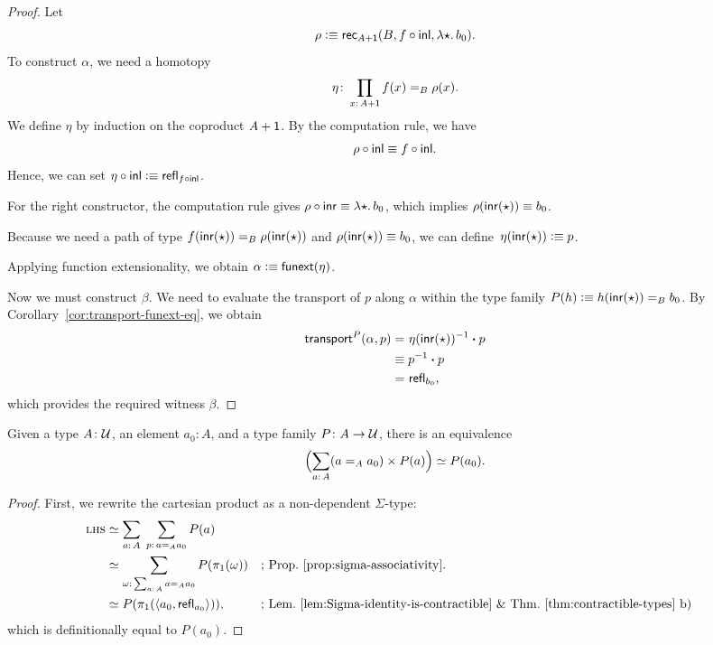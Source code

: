 \begin{proof}
    Let
    \[
        \rho\mathrel{\vcentcolon}\equiv\mathsf{rec}_{A+\mathsf{1}}(
            B,
            f\circ\mathsf{inl},
            \lambda{\mathsf{\star}}.\,b_0
        ).
    \]
    To construct $\alpha$, we need a homotopy
    \[
        \eta\colon\prod_{x\colon A+\fun1}
            f(x)\eq{B}\rho(x).
    \]
    We define $\eta$ by induction on the coproduct $A+\mathsf{1}$. By the computation rule, we have
    \[
        \rho\circ\mathsf{inl}\equiv f\circ\mathsf{inl}.
    \]
    Hence, we can set $\eta\circ\mathsf{inl}\mathrel{\vcentcolon}\equiv\mathsf{refl}_{f\circ\mathsf{inl}}$. 

    For the right constructor, the computation rule gives $\rho\circ\mathsf{inr}\equiv\lambda{\mathsf{\star}}.\,b_0$, which implies $\rho(\mathsf{inr}({\mathsf{\star}}))\equiv b_0$.
    
    Because we need a path of type $f(\mathsf{inr}({\mathsf{\star}}))\mathrel{=_{B}}\rho(\mathsf{inr}({\mathsf{\star}}))$ and $\rho(\mathsf{inr}({\mathsf{\star}}))\equiv b_0$, we can define~$\eta(\mathsf{inr}({\mathsf{\star}}))\mathrel{\vcentcolon}\equiv p$. 
    
    Applying function extensionality, we obtain $\alpha\mathrel{\vcentcolon}\equiv\mathsf{funext}(\eta)$.

    Now we must construct $\beta$. We need to evaluate the transport of $p$ along $\alpha$ within the type family $P(h)\mathrel{\vcentcolon}\equiv h(\mathsf{inr}({\mathsf{\star}}))\mathrel{=_{B}}b_0$. By Corollary~\ref{cor:transport-funext-eq}, we obtain
    \begin{align*}
        \mathsf{transport}^P(\alpha,p)
            &\mathrel{=_{}}\eta(\mathsf{inr}({\mathsf{\star}}))^{-1}\mathbin{\boldsymbol{\cdot}} p\\
            &\equiv p^{-1}\mathbin{\boldsymbol{\cdot}} p\\
            &\mathrel{=_{}}\mathsf{refl}_{b_0},
    \end{align*}
    which provides the required witness $\beta$.
\end{proof}

\begin{lem}\label{lem:sigma-identity-product}
    Given a type\/ $A\colon\univ$, an element\/ $a_0\colon A$, and a type family\/ $P\colon A\to\univ$, there is an equivalence
    \[
        \Bigl(
            \sum_{a\colon A}(a\eq{A}a_0)\times P(a)
        \Bigr)
        \simeq P(a_0).
    \]
\end{lem}

\begin{proof}
    First, we rewrite the cartesian product as a non-dependent $\Sigma$-type:
    \begin{align*}
        \lhs
            &\simeq\sum_{a\colon A}\;\sum_{p\colon a\eq{A}a_0}P(a)\\
            &\simeq\sum_{\omega\colon\sum_{a\colon A}a\eq{A}a_0}P(\pi_1(\omega))
            &&\text{; Prop.~\ref{prop:sigma-associativity}.}\\
            &\simeq P(\pi_1(\dep{a_0,\fun{refl}_{a_0}})),
            &&\text{; Lem.~\ref{lem:Sigma-identity-is-contractible} \& Thm.~\ref{thm:contractible-types}~b)}
    \end{align*}
    which is definitionally equal to $P(a_0)$.
\end{proof}

